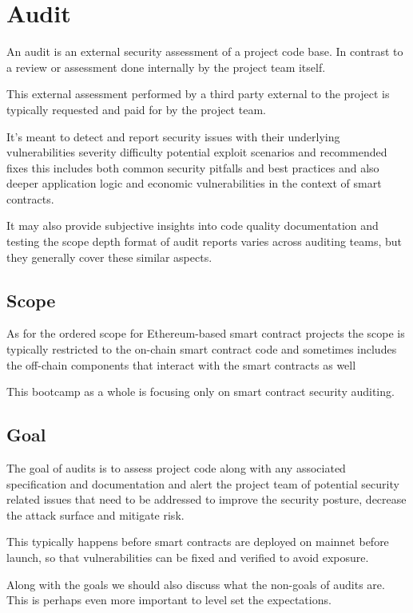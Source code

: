 \section{Audit}\label{audit}

An audit is an external security assessment of a project code base. In
contrast to a review or assessment done internally by the project team
itself.

This external assessment performed by a third party external to the
project is typically requested and paid for by the project team.

It's meant to detect and report security issues with their underlying
vulnerabilities severity difficulty potential exploit scenarios and
recommended fixes this includes both common security pitfalls and best
practices and also deeper application logic and economic vulnerabilities
in the context of smart contracts.

It may also provide subjective insights into code quality documentation
and testing the scope depth format of audit reports varies across
auditing teams, but they generally cover these similar aspects.

\subsection{Scope}\label{scope}

As for the ordered scope for Ethereum-based smart contract projects the
scope is typically restricted to the on-chain smart contract code and
sometimes includes the off-chain components that interact with the smart
contracts as well

This bootcamp as a whole is focusing only on smart contract security
auditing.

\subsection{Goal}\label{goal}

The goal of audits is to assess project code along with any associated
specification and documentation and alert the project team of potential
security related issues that need to be addressed to improve the
security posture, decrease the attack surface and mitigate risk.

This typically happens before smart contracts are deployed on mainnet
before launch, so that vulnerabilities can be fixed and verified to
avoid exposure.

Along with the goals we should also discuss what the non-goals of audits
are. This is perhaps even more important to level set the expectations.

